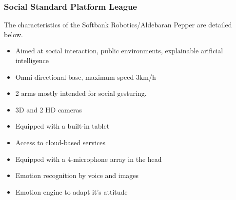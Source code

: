 \subsubsection{Social Standard Platform League}
The characteristics of the Softbank Robotics/Aldebaran Pepper are detailed below. 

\begin{itemize}
    \item Aimed at social interaction, public environments, explainable arificial intelligence
    \item Omni-directional base, maximum speed 3km/h
    \item 2 arms mostly intended for social gesturing. 
    \item 3D and 2 HD cameras
    \item Equipped with a built-in tablet
    \item Access to cloud-based services
    \item Equipped with a 4-microphone array in the head
    \item Emotion recognition by voice and images
    \item Emotion engine to adapt it's attitude
\end{itemize}